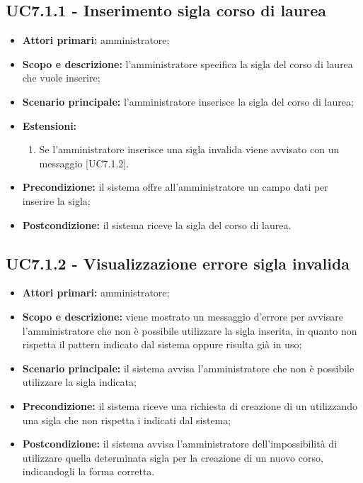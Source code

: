 \documentclass[AnalisiDeiRequisiti.tex]{subfiles}
\begin{document}
\subsection{UC7.1.1 - Inserimento sigla corso di laurea}
\begin{itemize}
	\item \textbf{Attori primari:} amministratore;
	\item \textbf{Scopo e descrizione:} l'amministratore specifica la sigla del corso di laurea che vuole inserire;
	\item \textbf{Scenario principale:} l'amministratore inserisce la sigla del corso di laurea;
	\item \textbf{Estensioni:}
	\begin{enumerate}
		\item Se l'amministratore inserisce una sigla invalida viene avvisato con un messaggio [UC7.1.2].
	\end{enumerate}
	\item \textbf{Precondizione:} il sistema offre all'amministratore un campo dati per inserire la sigla; 
	\item \textbf{Postcondizione:} il sistema riceve la sigla del corso di laurea.
\end{itemize}

\subsection{UC7.1.2 - Visualizzazione errore sigla invalida}
\begin{itemize}
	\item \textbf{Attori primari:} amministratore;
	\item \textbf{Scopo e descrizione:} viene mostrato un messaggio d'errore per avvisare l'amministratore che non è possibile utilizzare la sigla inserita, in quanto non rispetta il pattern indicato dal sistema oppure risulta già in uso;
	\item \textbf{Scenario principale:} il sistema avvisa l'amministratore che non è possibile utilizzare la sigla indicata;
	\item \textbf{Precondizione:} il sistema riceve una richiesta di creazione di un  utilizzando una sigla che non rispetta i  indicati dal sistema; 
	\item \textbf{Postcondizione:} il sistema avvisa l'amministratore dell'impossibilità di utilizzare quella determinata sigla per la creazione di un nuovo corso, indicandogli la forma corretta.
\end{itemize}
\end{document}
